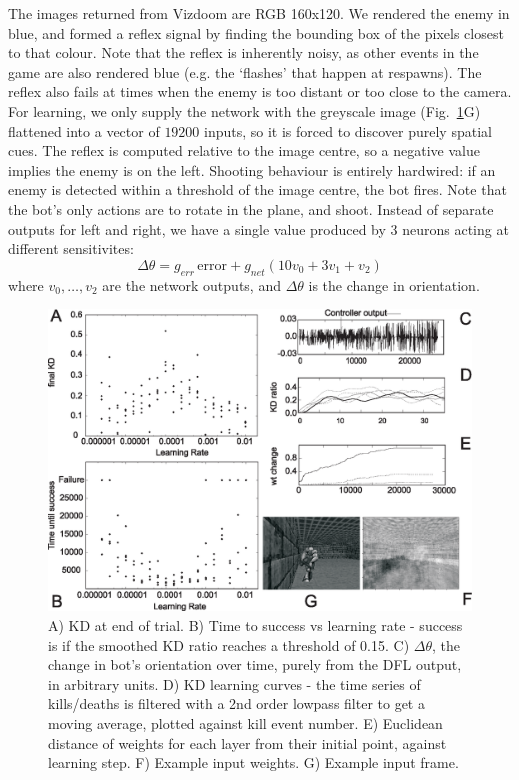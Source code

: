 \documentclass{llncs}
\begin{document}
The images returned from Vizdoom are RGB 160x120. We rendered the
enemy in blue, and formed a reflex signal by finding the bounding box
of the pixels closest to that colour. Note that the reflex is
inherently noisy, as other events in the game are also rendered blue
(e.g. the ‘flashes’ that happen at respawns). The reflex
also fails at times when the enemy is too distant or too close to the
camera. For learning, we only supply the network with the greyscale
image (Fig.~\ref{shooter_results}G) flattened into a vector of $19200$ inputs, so it is forced to discover
purely spatial cues. The reflex is computed relative to the image
centre, so a negative value implies the enemy is on the left. Shooting
behaviour is entirely hardwired: if an enemy is detected within a
threshold of the image centre, the bot fires. Note that the bot's only actions are to rotate in the plane, and shoot. Instead of separate
outputs for left and right, we have a single value produced by 3
neurons acting at different sensitivites:
\begin{equation}
\Delta \theta = g_{err}\, \mathrm{error} + g_{net} \left( 10 v_0 + 3 v_1 + v_2 \right)
\end{equation}
where $v_0, \ldots, v_2$ are the network outputs, and $\Delta \theta$ is the change in orientation.


\begin{figure}[h!]
	\centering \includegraphics[width=\columnwidth]{FPSFig7}
	\caption{A) KD at end of trial. B) Time to success vs learning
          rate - success is if the smoothed KD ratio reaches a threshold of 0.15. C) $\Delta \theta$, the change in bot's orientation over time, purely from the DFL output, in arbitrary units. D) KD learning curves - the time series of kills/deaths is filtered with a 2nd order lowpass filter to get a moving average, plotted against kill event number. E)
          Euclidean distance of weights for each layer from their initial point, against learning step. F) Example input weights. G) Example input frame.
		\label{shooter_results}}
\end{figure}
\end{document}
